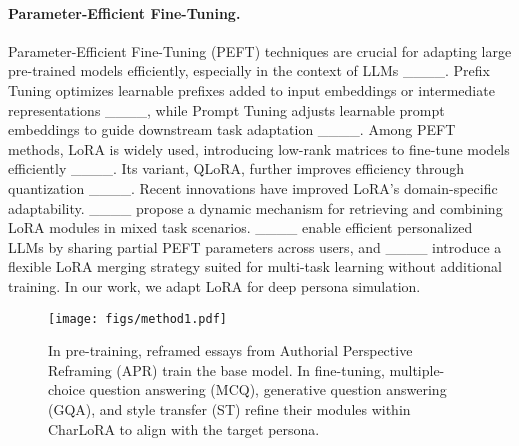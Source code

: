 \paragraph{Parameter-Efficient Fine-Tuning.}
Parameter-Efficient Fine-Tuning (PEFT) techniques are crucial for adapting large pre-trained models efficiently, especially in the context of LLMs ____. Prefix Tuning optimizes learnable prefixes added to input embeddings or intermediate representations ____, while Prompt Tuning adjusts learnable prompt embeddings to guide downstream task adaptation ____. Among PEFT methods, LoRA is widely used, introducing low-rank matrices to fine-tune models efficiently ____. Its variant, QLoRA, further improves efficiency through quantization ____.
Recent innovations have improved LoRA’s domain-specific adaptability. ____ propose a dynamic mechanism for retrieving and combining LoRA modules in mixed task scenarios. ____ enable efficient personalized LLMs by sharing partial PEFT parameters across users, and ____ introduce a flexible LoRA merging strategy suited for multi-task learning without additional training. In our work, we adapt LoRA for deep persona simulation.

\begin{figure*}[t]
    \centering
    \texttt{[image: figs/method1.pdf]}
    \caption{In pre-training, reframed essays from Authorial Perspective Reframing (APR) train the base model. In fine-tuning, multiple-choice question answering (MCQ), generative question answering (GQA), and style transfer (ST) refine their modules within CharLoRA to align with the target persona.}
    \label{fig:method}
\end{figure*}